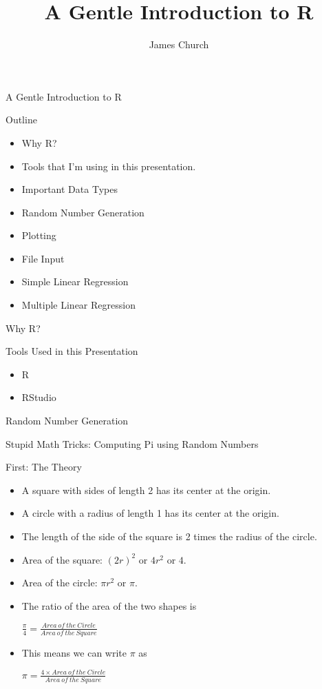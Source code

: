 \documentclass{beamer}
\author{James Church}
\title{A Gentle Introduction to R}
\begin{document}
\frame[plain]{ \titlepage }

\begin{frame}{A Gentle Introduction to R}

    Outline

    \begin{itemize}
        \item Why R?
        \item Tools that I'm using in this presentation.
        \item Important Data Types
        \item Random Number Generation
        \item Plotting
        \item File Input
        \item Simple Linear Regression
        \item Multiple Linear Regression
    \end{itemize}

\end{frame}

\begin{frame}{Why R?}
\end{frame}

\begin{frame}{Tools Used in this Presentation}
    \begin{itemize}
        \item R
        \item RStudio
    \end{itemize}
\end{frame}

\begin{frame}{Random Number Generation}

    Stupid Math Tricks: Computing Pi using Random Numbers

    First: The Theory

    \begin{itemize}
        \item A square with sides of length 2 has its center at the origin.
        \item A circle with a radius of length 1 has its center at the origin.
        \item The length of the side of the square is 2 times the radius of the circle. 
	\item Area of the square: $(2r)^2$ or $4r^2$ or $4$.
	\item Area of the circle: $\pi r^2$ or $\pi$.
	\item The ratio of the area of the two shapes is

	\begin{math}
	\frac{\pi}{4} = \frac{Area\:of\:the\:Circle}{Area\:of\:the\:Square}
	\end{math}

	\item This means we can write $\pi$ as

	\begin{math}
	\pi = \frac{4 \times Area\:of\:the\:Circle}{Area\:of\:the\:Square}
	\end{math}

    \end{itemize}
\end{frame}
\end{document}
